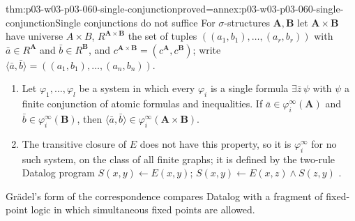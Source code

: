\begin{hblemma}{thm:p03-w03-p03-060-single-conjunction}{proved=annex:p03-w03-p03-060-single-conjunction}{Single conjunctions do not suffice}
For \(\sigma\)-structures \(\mathbf A,\mathbf B\) let
\(\mathbf A\times\mathbf B\) have universe \(A\times B\), \(R^{\mathbf A\times\mathbf B}\) the set of
tuples \(((a_1,b_1),\ldots,(a_r,b_r))\) with \(\bar a\in R^{\mathbf A}\)
and \(\bar b\in R^{\mathbf B}\), and
\(c^{\mathbf A\times\mathbf B}=(c^{\mathbf A},c^{\mathbf B})\); write
\(\langle\bar a,\bar b\rangle=((a_1,b_1),\ldots,(a_n,b_n))\).
\begin{enumerate}
\item Let \(\varphi_1,\ldots,\varphi_l\) be a system in which every
      \(\varphi_i\) is a single formula \(\exists\bar z\,\psi\) with
      \(\psi\) a finite conjunction of atomic formulas and inequalities.
      If \(\bar a\in\varphi_i^\infty(\mathbf A)\) and
      \(\bar b\in\varphi_i^\infty(\mathbf B)\), then
      \(\langle\bar a,\bar b\rangle\in\varphi_i^\infty(\mathbf A\times\mathbf B)\).
\item The transitive closure of \(E\) does not have this property, so it
      is \(\varphi_i^\infty\) for no such system, on the class of all
      finite graphs; it is defined by the two-rule Datalog program
      \(S(x,y)\leftarrow E(x,y)\); \(S(x,y)\leftarrow E(x,z)\wedge S(z,y)\)
      \cite[Ex.~6.18, p.~42]{Kolaitis2003ExpressivePowerNotes}.
\end{enumerate}
\end{hblemma}

Gr\"adel's form of the correspondence compares Datalog with a fragment of
fixed-point logic in which simultaneous fixed points are allowed.

